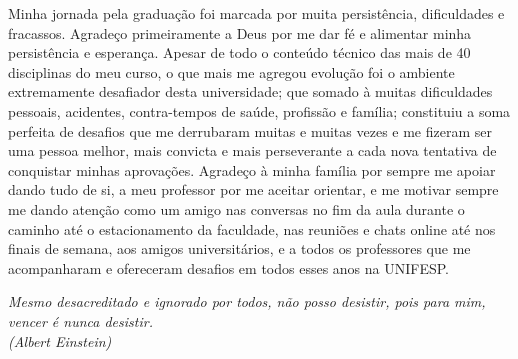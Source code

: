 \documentclass[	12pt, Times, openright, twoside, a4paper, english, brazil]{abntex2}
\begin{document}
\begin{agradecimentos}
Minha jornada pela graduação foi marcada por muita persistência, dificuldades e fracassos. Agradeço primeiramente a Deus por me dar fé e alimentar minha persistência e esperança. Apesar de todo o conteúdo técnico das mais de 40 disciplinas do meu curso, o que mais me agregou evolução foi o ambiente extremamente desafiador desta universidade; que somado à muitas dificuldades pessoais, acidentes, contra-tempos de saúde, profissão e família; constituiu a soma perfeita de desafios que me derrubaram muitas e muitas vezes e me fizeram ser uma pessoa melhor, mais convicta e mais perseverante a cada nova tentativa de conquistar minhas aprovações. Agradeço à minha família por sempre me apoiar dando tudo de si, a meu professor por me aceitar orientar, e me motivar sempre me dando atenção como um amigo nas conversas no fim da aula durante o caminho até o estacionamento da faculdade, nas reuniões e chats online até nos finais de semana, aos amigos universitários, e a todos os professores que me acompanharam e ofereceram desafios em todos esses anos na UNIFESP. 

\end{agradecimentos}

\begin{epigrafe}
    \vspace*{\fill}
	\begin{flushright}
		\textit{Mesmo desacreditado e ignorado por todos, não posso desistir, pois para mim, vencer é nunca desistir.\\
		(Albert Einstein)}
	\end{flushright}
\end{epigrafe}

\end{document}
